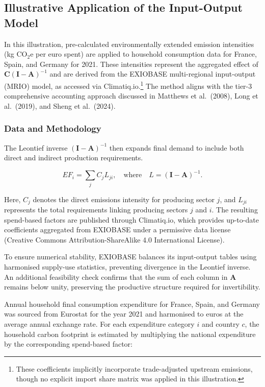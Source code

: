 \documentclass[12pt,a4paper]{article}%
\begin{document}
\subsection{Illustrative Application of the Input-Output Model}

In this illustration, pre-calculated environmentally extended emission intensities (kg CO$_{2}$e per euro spent) are applied to household consumption data for France, Spain, and Germany for 2021. These intensities represent the aggregated effect of $\mathbf{C} {(\mathbf{I}-\mathbf{A})}^{-1}$ and are derived from the EXIOBASE multi-regional input-output (MRIO) model, as accessed via Climatiq.io.\footnote{These coefficients implicitly incorporate trade-adjusted upstream emissions, though no explicit import share matrix was applied in this illustration.} The method aligns with the tier-3 comprehensive accounting approach discussed in Matthews et al.~(2008), Long et al.~(2019), and Sheng et al.~(2024).

\subsubsection{Data and Methodology}

The Leontief inverse ${(\mathbf{I} - \mathbf{A})}^{-1}$ then expands final demand to include both direct and indirect production requirements.

\begin{equation}
  EF_i = \sum_{j} C_j L_{ji}, 
\quad \text{where} \quad 
L = {(\mathbf{I} - \mathbf{A})}^{-1}.
\end{equation}



Here, $C_j$ denotes the direct emissions intensity for producing sector $j$, and $L_{ji}$ represents the total requirements linking producing sectors $j$ and $i$. The resulting spend-based factors are published through Climatiq.io, which provides up-to-date coefficients aggregated from EXIOBASE under a permissive data license (Creative Commons Attribution-ShareAlike 4.0 International License).

To ensure numerical stability, EXIOBASE balances its input-output tables using harmonised supply-use statistics, preventing divergence in the Leontief inverse. An additional feasibility check confirms that the sum of each column in $\mathbf{A}$ remains below unity, preserving the productive structure required for invertibility.

Annual household final consumption expenditure for France, Spain, and Germany was sourced from Eurostat for the year 2021 and harmonised to euros at the average annual exchange rate. For each expenditure category $i$ and country $c$, the household carbon footprint is estimated by multiplying the national expenditure by the corresponding spend-based factor:
\end{document}
